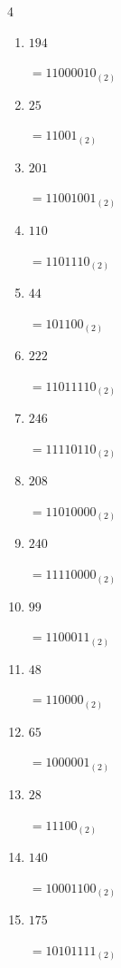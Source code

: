 \newpage
\resetdrill

\begin{multicols}{4}
\begin{enumerate}
  \itemsep=10pt
  \item $194$

        $=11000010_{(2)}$

  \item $25$

        $=11001_{(2)}$

  \item $201$

        $=11001001_{(2)}$

  \item $110$

        $=1101110_{(2)}$

  \item $44$

        $=101100_{(2)}$

  \item $222$

        $=11011110_{(2)}$

  \item $246$

        $=11110110_{(2)}$

  \item $208$

        $=11010000_{(2)}$

  \item $240$

        $=11110000_{(2)}$

  \item $99$

        $=1100011_{(2)}$

  \item $48$

        $=110000_{(2)}$

  \item $65$

        $=1000001_{(2)}$

  \item $28$

        $=11100_{(2)}$

  \item $140$

        $=10001100_{(2)}$

  \item $175$

        $=10101111_{(2)}$


\end{enumerate}
\end{multicols}
